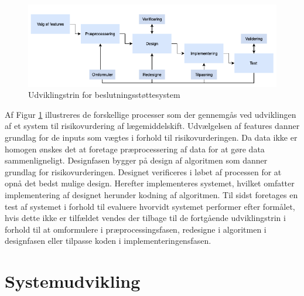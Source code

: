 \begin{figure}[H]\centering	\includegraphics[width=1\textwidth]{billeder/udviklingstrin.png} 
	\caption{Udviklingstrin for beslutningsstøttesystem}
	\label{fig:metode}  
\end{figure}
\vspace{-0.5cm}

Af Figur \ref{fig:metode} illustreres de forskellige processer som der gennemgås ved udviklingen af et system til risikovurdering af lægemiddelskift. Udvælgelsen af features danner grundlag for de inputs som vægtes i forhold til risikovurderingen. Da data ikke er homogen ønskes det at foretage præprocessering af data for at gøre data sammenligneligt. Designfasen bygger på design af algoritmen som danner grundlag for risikovurderingen. Designet verificeres i løbet af processen for at opnå det bedst mulige design. Herefter implementeres systemet, hvilket omfatter implementering af designet herunder kodning af algoritmen. Til sidst foretages en test af systemet i forhold til evaluere hvorvidt systemet performer efter formålet, hvis dette ikke er tilfældet vendes der tilbage til de fortgående udviklingstrin i forhold til at omformulere i  præprocessingsfasen, redesigne i algoritmen i designfasen eller tilpasse koden i implementeringensfasen. 





\chapter{Systemudvikling}
